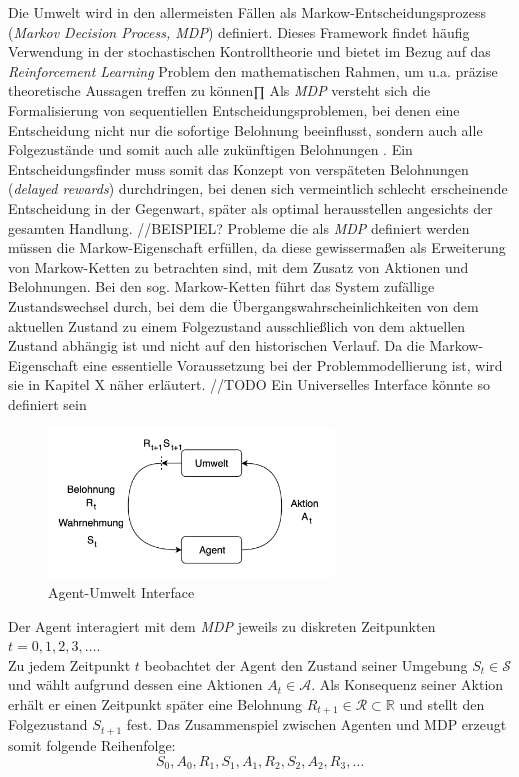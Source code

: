\par 
Die Umwelt wird in den allermeisten Fällen als Markow-Entscheidungsprozess (\textit{Markov Decision Process, MDP}) definiert. Dieses Framework findet häufig Verwendung in der stochastischen Kontrolltheorie\cite[S.~3]{Gosavi} und bietet im Bezug auf das \textit{Reinforcement Learning} Problem den mathematischen Rahmen, um u.a. präzise theoretische Aussagen treffen zu können∏ Als \textit{MDP} versteht sich die Formalisierung von sequentiellen Entscheidungsproblemen, bei denen eine Entscheidung nicht nur die sofortige Belohnung beeinflusst, sondern auch alle Folgezustände und somit auch alle zukünftigen Belohnungen \cite[S.~47]{Sutton1998}. Ein Entscheidungsfinder muss somit das Konzept von verspäteten Belohnungen (\textit{delayed rewards}) durchdringen, bei denen sich vermeintlich schlecht erscheinende Entscheidung in der Gegenwart, später als optimal herausstellen angesichts der gesamten Handlung. //BEISPIEL?
Probleme die als \textit{MDP} definiert werden müssen die Markow-Eigenschaft erfüllen, da diese gewissermaßen als Erweiterung von Markow-Ketten zu betrachten sind, mit dem Zusatz von Aktionen und Belohnungen. Bei den sog. Markow-Ketten führt das System zufällige Zustandswechsel durch, bei dem die Übergangswahrscheinlichkeiten von dem aktuellen Zustand zu einem Folgezustand ausschließlich von dem aktuellen Zustand abhängig ist und nicht auf den historischen Verlauf\cite[S.~3]{Gosavi}. Da die Markow-Eigenschaft eine essentielle Voraussetzung bei der Problemmodellierung ist, wird sie in Kapitel X näher erläutert.
//TODO Ein Universelles Interface könnte so definiert sein

\par 

\begin{figure}[H]
    \centering
    \includegraphics[height=150px]{images/agentUmweltInterface.png}
    \caption{Agent-Umwelt Interface}
\end{figure}


Der Agent interagiert mit dem \textit{MDP} jeweils zu diskreten Zeitpunkten $t = 0, 1, 2, 3, \dots$. \\
Zu jedem Zeitpunkt $t$ beobachtet der Agent den Zustand seiner Umgebung $S_t \in \mathcal{S}$ und wählt aufgrund dessen eine Aktionen $A_t \in \mathcal{A}$. Als Konsequenz seiner Aktion erhält er einen Zeitpunkt später eine Belohnung $R_{t+1} \in \mathcal{R} \subset\mathbb{R} $ und stellt den Folgezustand $S_{t+1}$ fest. Das Zusammenspiel zwischen Agenten und MDP erzeugt somit folgende Reihenfolge:
\begin{equation}\label{eq:episode}
    S_0, A_0, R_1, S_1, A_1, R_2, S_2, A_2, R_3, \dots
\end{equation}

